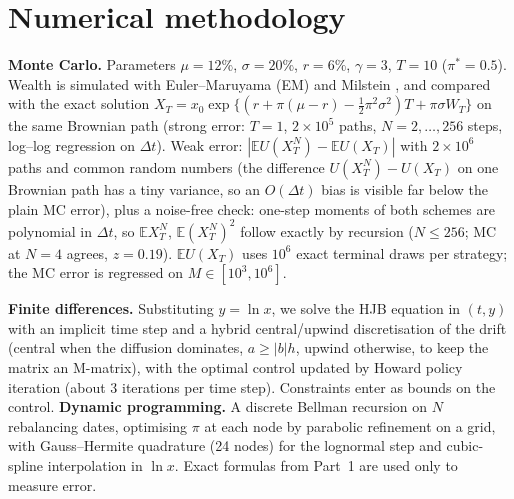 \documentclass[10pt,a4paper]{article}
\newcommand{\E}{\mathbb E}
\begin{document}
\section{Numerical methodology}
\textbf{Monte Carlo.} Parameters $\mu=12\%$, $\sigma=20\%$, $r=6\%$, $\gamma=3$, $T=10$ ($\pi^*=0.5$). Wealth is simulated with Euler--Maruyama (EM) and Milstein \cite{kp,glass}, and compared with the exact solution $X_T=x_0\exp\{(r+\pi(\mu-r)-\tfrac12\pi^2\sigma^2)T+\pi\sigma W_T\}$ on the same Brownian path (strong error: $T{=}1$, $2\!\times\!10^5$ paths, $N=2,\dots,256$ steps, log--log regression on $\Delta t$). Weak error: $|\E U(X^N_T)-\E U(X_T)|$ with $2\times10^6$ paths and common random numbers (the difference $U(X^N_T)-U(X_T)$ on one Brownian path has a tiny variance, so an $O(\Delta t)$ bias is visible far below the plain MC error), plus a noise-free check: one-step moments of both schemes are polynomial in $\Delta t$, so $\E X^N_T$, $\E (X^N_T)^2$ follow exactly by recursion ($N\le256$; MC at $N{=}4$ agrees, $z{=}0.19$). $\E U(X_T)$ uses $10^{6}$ exact terminal draws per strategy; the MC error is regressed on $M\in[10^3,10^6]$.

\textbf{Finite differences.} Substituting $y=\ln x$, we solve the HJB equation in $(t,y)$ with an implicit time step and a hybrid central/upwind discretisation of the drift (central when the diffusion dominates, $a\ge|b|h$, upwind otherwise, to keep the matrix an M-matrix), with the optimal control updated by Howard policy iteration (about 3 iterations per time step). Constraints enter as bounds on the control. \textbf{Dynamic programming.} A discrete Bellman recursion \cite{samuelson} on $N$ rebalancing dates, optimising $\pi$ at each node by parabolic refinement on a grid, with Gauss--Hermite quadrature (24 nodes) for the lognormal step and cubic-spline interpolation in $\ln x$. Exact formulas from Part~1 are used only to measure error.
\end{document}
